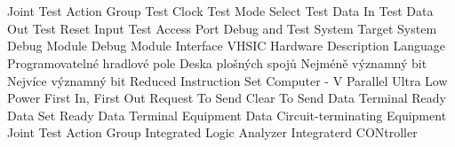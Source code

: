 \cleardoublepage
\chapter*{\listofabbrevname}
{}

\begin{acronym}[KolikMista]

		{Joint Test Action Group}
		{Test Clock}
		{Test Mode Select}
		{Test Data In}
		{Test Data Out}
		{Test Reset Input}
		{Test Access Port}
		{Debug and Test System}
		{Target System}
		{Debug Module}
		{Debug Module Interface}					
		{VHSIC Hardware Description Language}
		{Programovatelné hradlové pole}
		{Deska plošných spojů}
		{Nejméně významný bit}
		{Nejvíce významný bit}
		{Reduced Instruction Set Computer - V}
		{Parallel Ultra Low Power}
		{First In, First Out}
		{Request To Send}
		{Clear To Send}
		{Data Terminal Ready}
		{Data Set Ready}
		{Data Terminal Equipment}
		{Data Circuit-terminating Equipment}
		{Joint Test Action Group}
		{Integrated Logic Analyzer}
		{Integraterd CONtroller}
		
\end{acronym}
